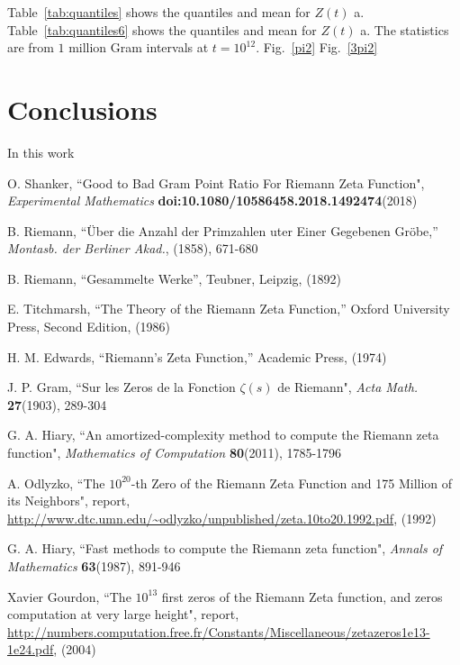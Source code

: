 \documentclass[twoside]{article}
\theoremstyle{definition}
\begin{document}
Table~\ref{tab:quantiles} shows the quantiles and mean for  $Z(t)$ a.  Table~\ref{tab:quantiles6} shows the quantiles and mean for  $Z(t)$ a. The statistics are from $1$ million Gram intervals at $t=10^{12}$. Fig.~\ref{pi2} Fig.~\ref{3pi2}

\section{\label{conclusions}Conclusions}

In this work 

\begin{thebibliography} {}

 O. Shanker, 
``Good to Bad Gram Point Ratio For Riemann Zeta Function",
{\it Experimental Mathematics} {\bf doi:10.1080/10586458.2018.1492474}(2018)



 B. Riemann, ``\"{U}ber die Anzahl der Primzahlen uter
Einer Gegebenen Gr\"{o}be,'' {\it Montasb. der Berliner Akad.}, (1858),
671-680

 B. Riemann, ``Gesammelte Werke'', Teubner, Leipzig, (1892)

 E. Titchmarsh, ``The Theory of the Riemann Zeta
Function,'' Oxford University Press, Second Edition, (1986)

 H. M. Edwards, ``Riemann's Zeta Function,''
Academic Press,  (1974)

 J. P. Gram, 
``Sur les Zeros de la Fonction  $\zeta ( s )$  de Riemann",
{\it Acta Math.} {\bf27}(1903), 289-304

 G. A. Hiary,
``An amortized-complexity method to compute the Riemann zeta function", 
{\it Mathematics of Computation} {\bf80}(2011), 1785-1796

  A. Odlyzko,
``The $10^{20}$-th Zero of the Riemann Zeta
Function and 175 Million of its Neighbors", report,
\url{http://www.dtc.umn.edu/~odlyzko/unpublished/zeta.10to20.1992.pdf}, (1992)

 G. A. Hiary,
``Fast methods to compute the Riemann zeta function",
{\it Annals of Mathematics} {\bf63}(1987), 891-946

 Xavier Gourdon,
``The $10^{13}$ first zeros of the Riemann Zeta function,
and zeros computation at very large height", report,
\url{http://numbers.computation.free.fr/Constants/Miscellaneous/zetazeros1e13-1e24.pdf}, (2004)


\end{thebibliography} 
\end{document}

